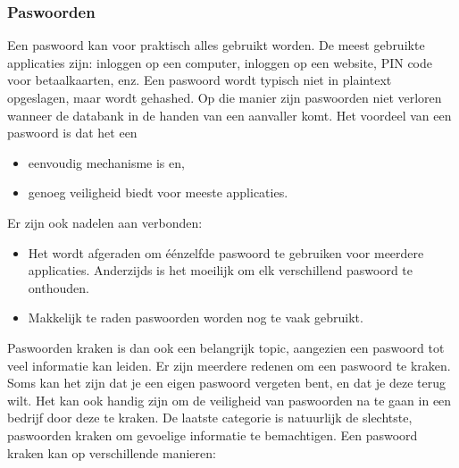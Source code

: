 \documentclass{report}
\begin{document}
	\subsubsection{Paswoorden}
	Een paswoord kan voor praktisch alles gebruikt worden. De meest gebruikte applicaties zijn: inloggen op een computer, inloggen op een website, PIN code voor betaalkaarten, enz. Een paswoord wordt typisch niet in plaintext opgeslagen, maar wordt gehashed. Op die manier zijn paswoorden niet verloren wanneer de databank in de handen van een aanvaller komt. Het voordeel van een paswoord is dat het een 
	\begin{itemize}
		\item[\good] eenvoudig mechanisme is en,
		\item[\good] genoeg veiligheid biedt voor meeste applicaties. 
	\end{itemize}
	Er zijn ook nadelen aan verbonden:
	\begin{itemize}
		\item[\alert] Het wordt afgeraden om éénzelfde paswoord te gebruiken voor meerdere applicaties. Anderzijds is het moeilijk om elk verschillend paswoord te onthouden.
		\item[\alert] Makkelijk te raden paswoorden worden nog te vaak gebruikt.
	\end{itemize}
	Paswoorden kraken is dan ook een belangrijk topic, aangezien een paswoord tot veel informatie kan leiden. Er zijn meerdere redenen om een paswoord te kraken. Soms kan het zijn dat je een eigen paswoord vergeten bent, en dat je deze terug wilt. Het kan ook handig zijn om de veiligheid van paswoorden na te gaan in een bedrijf door deze te kraken. De laatste categorie is natuurlijk de slechtste, paswoorden kraken om gevoelige informatie te bemachtigen. Een paswoord kraken kan op verschillende manieren:
\end{document}
